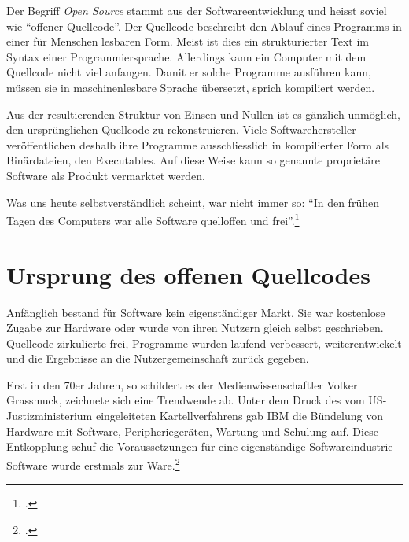 \documentclass[
paper=164mm:234mm, %
pagesize, %
DIV=calc, %
10pt, %
parskip=half- %
]{scrbook}
\begin{document}
Der Begriff \emph{Open Source} stammt aus der Softwareentwicklung und heisst soviel wie \enquote{offener Quellcode}. Der Quellcode beschreibt den Ablauf eines Programms in einer für Menschen lesbaren Form. Meist ist dies ein strukturierter Text im Syntax einer Programmiersprache. Allerdings kann ein Computer mit dem Quellcode nicht viel anfangen. Damit er solche Programme ausführen kann, müssen sie in maschinenlesbare Sprache übersetzt, sprich kompiliert werden.

Aus der resultierenden Struktur von Einsen und Nullen ist es gänzlich unmöglich, den ursprünglichen Quellcode zu rekonstruieren. Viele Softwarehersteller veröffentlichen deshalb ihre Programme ausschliesslich in kompilierter Form als Binärdateien, den Executables. Auf diese Weise kann so genannte proprietäre Software als Produkt vermarktet werden.

Was uns heute selbstverständlich scheint, war nicht immer so: \enquote{In den frühen Tagen des Computers war alle Software quelloffen und frei}.\footnote{\cite[202]{Grassmuck:2004}.}


{}
\section*{Ursprung des offenen Quellcodes}

Anfänglich bestand für Software kein eigenständiger Markt. Sie war kostenlose Zugabe zur Hardware oder wurde von ihren Nutzern gleich selbst geschrieben. Quellcode zirkulierte frei, Programme wurden laufend verbessert, weiterentwickelt und die Ergebnisse an die Nutzergemeinschaft zurück gegeben.

Erst in den 70er Jahren, so schildert es der Medienwissenschaftler Volker Grassmuck, zeichnete sich eine Trendwende ab. Unter dem Druck des vom US-Justizministerium eingeleiteten Kartellverfahrens gab IBM die Bündelung von Hardware mit Software, Peripheriegeräten, Wartung und Schulung auf. Diese Entkopplung schuf die Voraussetzungen für eine eigenständige Softwareindustrie - Software wurde erstmals zur Ware.\footnote{\cite[203]{Grassmuck:2004}.}
\end{document}

